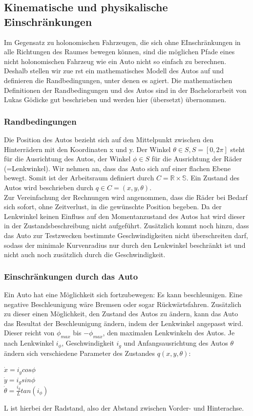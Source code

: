 \subsection{Kinematische und physikalische Einschränkungen}
Im Gegensatz zu holonomischen Fahrzeugen, die sich ohne EInschränkungen in alle Richtungen des Raumes bewegen können, sind die möglichen Pfade eines nicht holonomischen Fahrzeug wie ein Auto nicht so einfach zu berechnen. Deshalb stellen wir zue
rst ein mathematisches Modell des Autos auf und definieren die Randbedingungen, unter denen es agiert.
Die mathematischen Definitionen der Randbedingungen und des Autos sind in der Bachelorarbeit von Lukas Gödicke \citep{Goedicke18} gut beschrieben und werden hier (übersetzt) übernommen. \\
\subsubsection{Randbedingungen}
Die Position des Autos bezieht sich auf den Mittelpunkt zwischen den Hinterrädern mit den Koordinaten x und y. Der Winkel $\theta \in S,  S=[0,2\pi]$ steht für die Ausrichtung des Autos, der Winkel $\phi \in S$ für die Ausrichtung der Räder (=Lenkwinkel). Wir nehmen an, dass das Auto sich auf einer flachen Ebene bewegt. Somit ist der Arbeitsraum definiert durch $C =  \mathbb{R \times S}$. Ein Zustand des Autos wird beschrieben durch $q \in C = (x,y,\theta)$.\\
Zur Vereinfachung der Rechnungen wird angenommen, dass die Räder bei Bedarf sich sofort, ohne Zeitverlust, in die gewünschte Position begeben. Da der Lenkwinkel keinen Einfluss auf den Momentanzustand des Autos hat wird dieser in der Zustandsbeschreibung nicht aufgeführt. Zusätzlich kommt noch hinzu, dass das Auto zur Testzwecken bestimmte Geschwindigkeiten nicht überschreiten darf, sodass der minimale Kurvenradius nur durch den Lenkwinkel beschränkt ist und nicht auch noch zusätzlich durch die Geschwindigkeit. \\

\subsubsection{Einschränkungen durch das Auto}
Ein Auto hat eine Möglichkeit sich fortzubewegen: Es kann beschleunigen. Eine negative Beschleunigung wäre Bremsen oder sogar Rückwärtsfahren. Zusätzlich zu dieser einen Möglichkeit, den Zustand des Autos zu ändern, kann das Auto das Resultat der Beschleunigung ändern, indem der Lenkwinkel angepasst wird. Dieser reicht von $\phi_{max}$ bis $-\phi_{max}$, den maximalen Lenkwinkeln des Autos.
Je nach Lenkwinkel $i_{\phi}$, Geschwindigkeit $i_g$ und Anfangsausrichtung des Autos $\theta$ ändern sich verschiedene Parameter des Zustandes $q(x,y, \theta) $: \\
\begin{center}
$ \dot{x} = i_g cos \phi $ \\
$ \dot{y} = i_g sin \phi$ \\
$ \dot{{\theta}} = \frac{i_g}{L} tan (i_{\phi}) $
\end{center}
L ist hierbei der Radstand, also der Abstand zwischen Vorder- und Hinterachse.

